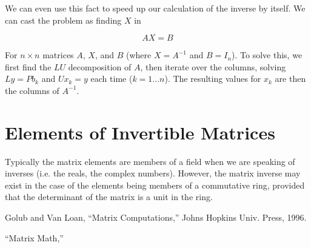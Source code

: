 \documentclass[12pt]{article}
\begin{document}
We can even use this fact to speed up our calculation of the inverse by itself.  We can cast the problem as finding $X$ in 

$$ AX = B $$

For $n \times n$ matrices $A$, $X$, and $B$ (where $X = A^{-1}$ and $B = I_n$).  To solve this, we first find the $LU$ decomposition of $A$, then iterate over the columns, solving $ Ly = Pb_k $ and $ Ux_k = y $ each time ($k = 1 \ldots n$).  The resulting values for $x_k$ are then the columns of $A^{-1}$.

\section{Elements of Invertible Matrices}

Typically the matrix elements are members of a field when we are speaking of inverses (i.e. the reals, the complex numbers).  However, the matrix inverse may exist in the case of the elements being members of a commutative ring, provided that the determinant of the matrix is a unit in the ring.

\begin{thebibliography}{3}

 Golub and Van Loan, ``Matrix Computations,'' Johns Hopkins Univ. Press, 1996.

 ``Matrix Math,'' 

\end{thebibliography}
\end{document}

